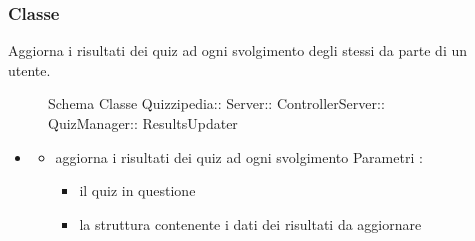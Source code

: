 \subsubsection{Classe }
Aggiorna i risultati dei quiz ad ogni svolgimento degli stessi da parte di un utente.
\begin{figure}[H]
\centering
\noindent{}
\caption[Schema Classe ResultsUpdater]{Schema Classe Quizzipedia:: Server:: ControllerServer:: QuizManager:: ResultsUpdater}
\end{figure}
\begin{itemize}
\item {}
\begin{itemize}
\item {}
\newline
aggiorna i risultati dei quiz ad ogni svolgimento
\newline
Parametri :
\begin{itemize}
\item {}
\newline
il quiz in questione
\item {}
\newline
la struttura contenente i dati dei risultati da aggiornare
\end{itemize}
\end{itemize}
\end{itemize}
